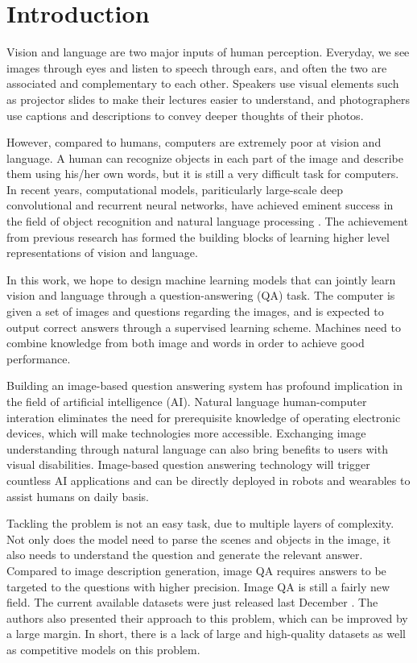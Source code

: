 \chapter{Introduction}
Vision and language are two major inputs of human perception. Everyday, we see images through eyes and listen to speech through ears, and often the two are associated and complementary to each other. Speakers use visual elements such as projector slides to make their lectures easier to understand, and photographers use captions and descriptions to convey deeper thoughts of their photos. 

However, compared to humans, computers are extremely poor at vision and language. A human can recognize objects in each part of the image and describe them using his/her own words, but it is still a very difficult task for computers. In recent years, computational models, pariticularly large-scale deep convolutional and recurrent neural networks, have achieved eminent success in the field of object recognition and natural language processing \cite{simonyan14, krizhevsky12, sutskever14, kiros14b}. The achievement from previous research has formed the building blocks of learning higher level representations of vision and language.

In this work, we hope to design machine learning models that can jointly learn vision and language through a question-answering (QA) task. The computer is given a set of images and questions regarding the images, and is expected to output correct answers through a supervised learning scheme. Machines need to combine knowledge from both image and words in order to achieve good performance.

Building an image-based question answering system has profound implication in the field of artificial intelligence (AI). Natural language human-computer interation eliminates the need for prerequisite knowledge of operating electronic devices, which will make technologies more accessible. Exchanging image understanding through natural language can also bring benefits to users with visual disabilities. Image-based question answering technology will trigger countless AI applications and can be directly deployed in robots and wearables to assist humans on daily basis.

Tackling the problem is not an easy task, due to multiple layers of complexity. Not only does the model need to parse the scenes and objects in the image, it also needs to understand the question and generate the relevant answer. Compared to image description generation, image QA requires answers to be targeted to the questions with higher precision. 
Image QA is still a fairly new field. The current available datasets were just released last December \cite{malinowski14a}. The authors also presented their approach to this problem, which can be improved by a large margin. In short, there is a lack of large and high-quality datasets as well as competitive models on this problem.

